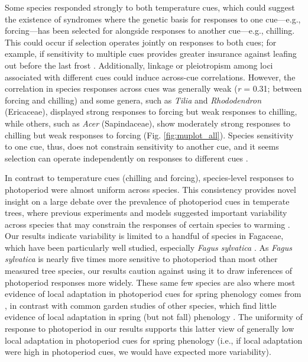 \documentclass[11pt]{article}
\newcommand{\R}[1]{\label{}\linelabel{#1}}
\begin{document}
Some species responded strongly to both temperature cues, which could suggest the existence of syndromes where the genetic basis for responses to one cue---e.g.,  forcing---has been selected for alongside responses to another cue---e.g., chilling. This could occur if selection operates jointly on responses to both cues; for example, if sensitivity to multiple cues provides greater insurance against leafing out before the last frost \citep{bonamour2019,memegan2021}. Additionally, linkage or pleiotropism among loci associated with different cues \citep{nakagawa2005} could induce across-cue correlations. However, the correlation in species responses across cues was generally weak (\emph{r} = 0.31; between forcing and chilling) and some genera, such as \emph{Tilia} and \emph{Rhododendron} (Ericaceae), displayed strong responses to forcing but weak responses to chilling, while others, such as \emph{Acer} (Sapindaceae), show moderately strong responses to chilling but weak responses to forcing (Fig. \ref{fig:muplot_all}). \R{whyuse1}Species sensitivity to one cue, thus, does not constrain sensitivity to another cue, and it seems selection can operate independently on responses to different cues \citep{bonamour2019}.\R{whyuse1E}

In contrast to temperature cues (chilling and forcing), species-level responses to photoperiod were almost uniform across species. \R{whyuse2}This consistency provides novel insight on a large debate over the prevalence of photoperiod cues in temperate trees, where previous experiments \citep{Basler:2012,zohner2016} and models \citep[e.g.,][]{Hunter:1992jw,schaber20203} suggested important variability across species that may constrain the responses of certain species to warming \citep{way2015}. Our results indicate variability is limited to a handful of species in Fagaceae, which have been particularly well studied, especially \emph{Fagus sylvatica} \citep[e.g.,][]{Basler:2012,zohner2016,kramer2017}. As \emph{Fagus sylvatica} is nearly five times more sensitive to photoperiod than most other measured tree species, our results caution against using it to draw inferences of photoperiod responses more widely. These same few species are also where most evidence of local adaptation in photoperiod cues for spring phenology comes from \citep[e.g.,][]{kramer2017}, in contrast with common garden studies of other species, which find little evidence of local adaptation in spring (but not fall) phenology \citep{aitken2016}. \R{whyuse2E}The uniformity of response to photoperiod in our results supports this latter view of generally low local adaptation in photoperiod cues for spring phenology (i.e., if local adaptation were high in photoperiod cues, we would have expected more variability). %
\end{document}
